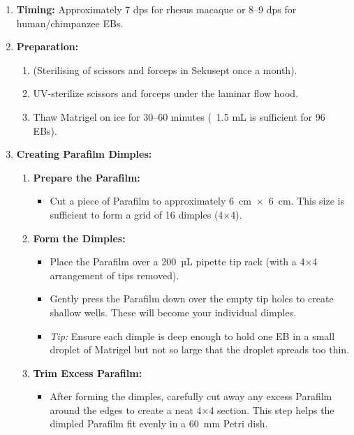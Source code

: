 \documentclass[11pt]{article}
\begin{document}
\begin{enumerate}[leftmargin=*]
    \item \textbf{Timing:} Approximately 7 dps for rhesus macaque or 8–9 dps for human/chimpanzee EBs.
    \item \textbf{Preparation:}
    \begin{enumerate}[leftmargin=*]
        \item (Sterilising of scissors and forceps in Sekusept once a month).
        \item UV-sterilize scissors and forceps under the laminar flow hood.
        \item Thaw Matrigel on ice for 30–60 minutes (~1.5 mL is sufficient for 96 EBs).
    \end{enumerate}

    \item \textbf{Creating Parafilm Dimples:}
    \begin{enumerate}[leftmargin=*]
        \item \textbf{Prepare the Parafilm:} 
        \begin{itemize}[leftmargin=*]
            \item Cut a piece of Parafilm to approximately 6~cm~×~6~cm. This size is sufficient to form a grid of 16 dimples (4×4).
        \end{itemize}

        \item \textbf{Form the Dimples:}
        \begin{itemize}[leftmargin=*]
            \item Place the Parafilm over a 200~µL pipette tip rack (with a 4×4 arrangement of tips removed).
            \item Gently press the Parafilm down over the empty tip holes to create shallow wells. These will become your individual dimples.
            \item \textit{Tip:} Ensure each dimple is deep enough to hold one EB in a small droplet of Matrigel but not so large that the droplet spreads too thin.
        \end{itemize}

        \item \textbf{Trim Excess Parafilm:}
        \begin{itemize}[leftmargin=*]
            \item After forming the dimples, carefully cut away any excess Parafilm around the edges to create a neat 4×4 section. This step helps the dimpled Parafilm fit evenly in a 60~mm Petri dish.
        \end{itemize}


\end{enumerate}
\end{enumerate}
\end{document}
